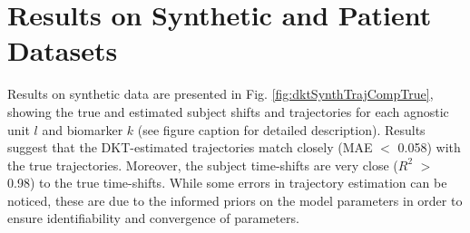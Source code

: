 \documentclass{llncs}
\begin{document}


\section{Results on Synthetic and Patient Datasets}
\label{sec:dktRes}

Results on synthetic data are presented in Fig. \ref{fig:dktSynthTrajCompTrue}, showing the true and estimated subject shifts and trajectories for each agnostic unit $l$ and biomarker $k$ (see figure caption for detailed description). Results suggest that the DKT-estimated trajectories match closely (MAE $<$ 0.058) with the true trajectories. Moreover, the subject time-shifts are very close ($R^2$ $>$ 0.98) to the true time-shifts. While some errors in trajectory estimation can be noticed, these are due to the informed priors on the model parameters in order to ensure identifiability and convergence of parameters.
\end{document}
